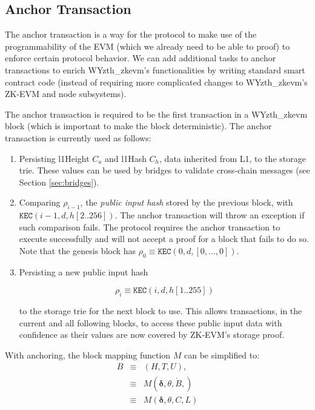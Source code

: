 \documentclass[9pt,oneside]{amsart}
\begin{document}
\begin{multicols}{2}
\subsection{Anchor Transaction} \label{sec:anchoring}

The anchor transaction is a way for the protocol to make use of the programmability of the EVM (which we already need to be able to proof) to enforce certain protocol behavior. We can add additional tasks to anchor transactions to enrich WYzth_zkevm's functionalities by writing standard smart contract code (instead of requiring more complicated changes to WYzth_zkevm's ZK-EVM and node subsystems).

The anchor transaction is required to be the first transaction in a WYzth_zkevm block (which is important to make the block deterministic). The anchor transaction is currently used as follows:

\begin{enumerate}
\item Persisting l1Height $C_a$ and l1Hash $C_h$, data inherited from L1, to the storage trie. These values can be used by bridges to validate cross-chain messages (see Section \ref{sec:bridges}).
\item Comparing $\rho_{i-1}$, the \textit{public input hash} stored by the previous block, with $\texttt{KEC}(i-1, d, h[2..256])$. The anchor transaction will throw an exception if such comparison fails. The protocol requires the anchor transaction to execute successfully and will not accept a proof for a block that fails to do so. Note that the genesis block has $\rho_0 \equiv \texttt{KEC}(0, d, [0,...,0])$.
\item Persisting a new public input hash

$$\rho_i \equiv \texttt{KEC}(i, d, h[1..255])$$ 

to the storage trie for the next block to use. This allows transactions, in the current and all following blocks, to access these public input data with confidence as their values are now covered by ZK-EVM's storage proof.
\end{enumerate}

With anchoring, the block mapping function $M$ can be simplified to:
\begin{eqnarray}
B & \equiv & (H, T, U), \\
\nonumber & \equiv &  M(\boldsymbol{\delta}, \theta, \dot{B}, )  \\
\nonumber & \equiv & M(\boldsymbol{\delta},  \theta, C, L)
\end{eqnarray}


\end{multicols}
\end{document}

